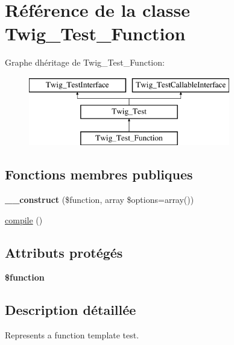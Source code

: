\hypertarget{class_twig___test___function}{}\section{Référence de la classe Twig\+\_\+\+Test\+\_\+\+Function}
\label{class_twig___test___function}
Graphe d\textquotesingle{}héritage de Twig\+\_\+\+Test\+\_\+\+Function\+:\begin{figure}[H]
\begin{center}
\leavevmode
\includegraphics[height=3.000000cm]{class_twig___test___function}
\end{center}
\end{figure}
\subsection*{Fonctions membres publiques}
\begin{DoxyCompactItemize}
\item 
{\bfseries \+\_\+\+\_\+construct} (\$function, array \$options=array())\hypertarget{class_twig___test___function_ae6ad9907bb7237c92e880ca6bfd16469}{}\label{class_twig___test___function_ae6ad9907bb7237c92e880ca6bfd16469}

\item 
\hyperlink{class_twig___test___function_a3815e7c2e73f00c2ebffcf5b90eef3b1}{compile} ()
\end{DoxyCompactItemize}
\subsection*{Attributs protégés}
\begin{DoxyCompactItemize}
\item 
{\bfseries \$function}\hypertarget{class_twig___test___function_af3e5d0d1ff43879d493dd97bb760c479}{}\label{class_twig___test___function_af3e5d0d1ff43879d493dd97bb760c479}

\end{DoxyCompactItemize}


\subsection{Description détaillée}
Represents a function template test.

